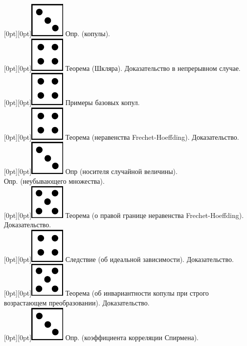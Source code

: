 \documentclass[10pt]{amsart}
\begin{document}
\begin{enumerate}
\begin{enumerate}
 \raisebox{-1pt}[0pt][0pt]{\includegraphics[width=0.02\linewidth]{3.png}} Опр. (копулы). \\
 \raisebox{-1pt}[0pt][0pt]{\includegraphics[width=0.02\linewidth]{4.png}} Теорема (Шкляра). Доказательство в непрерывном случае. \\
 \raisebox{-1pt}[0pt][0pt]{\includegraphics[width=0.02\linewidth]{4.png}} Примеры базовых копул. \\
 \raisebox{-1pt}[0pt][0pt]{\includegraphics[width=0.02\linewidth]{4.png}} Теорема (неравенства Frechet-Hoeffding). Доказательство. \\
 \raisebox{-1pt}[0pt][0pt]{\includegraphics[width=0.02\linewidth]{3.png}} Опр (носителя случайной величины). \\
Опр. (неубывающего множества). \\
 \raisebox{-1pt}[0pt][0pt]{\includegraphics[width=0.02\linewidth]{5.png}} Теорема (о правой границе неравенства Frechet-Hoeffding).  Доказательство. \\
 \raisebox{-1pt}[0pt][0pt]{\includegraphics[width=0.02\linewidth]{4.png}} Следствие (об идеальной зависимости). Доказательство. \\
 \raisebox{-1pt}[0pt][0pt]{\includegraphics[width=0.02\linewidth]{5.png}} Теорема (об инвариантности копулы при строго возрастающем преобразовании). Доказательство. \\
 \raisebox{-1pt}[0pt][0pt]{\includegraphics[width=0.02\linewidth]{3.png}} Опр. (коэффициента корреляции Спирмена). \\

\end{enumerate}
\end{enumerate}
\end{document}
